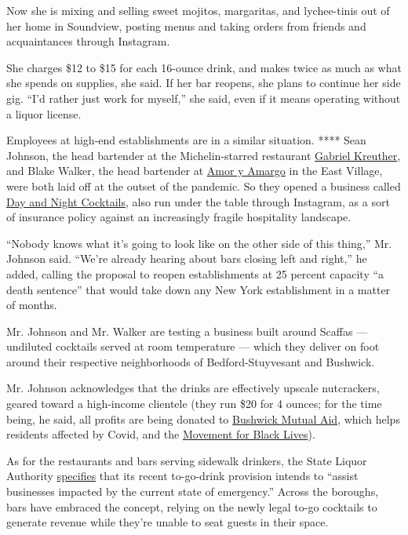 Now she is mixing and selling sweet mojitos, margaritas, and
lychee-tinis out of her home in Soundview, posting menus and taking
orders from friends and acquaintances through Instagram.

She charges \$12 to \$15 for each 16-ounce drink, and makes twice as
much as what she spends on supplies, she said. If her bar reopens, she
plans to continue her side gig. ``I'd rather just work for myself,'' she
said, even if it means operating without a liquor license.

Employees at high-end establishments are in a similar situation. ****
Sean Johnson, the head bartender at the Michelin-starred restaurant
\href{https://www.gknyc.com/}{Gabriel Kreuther}, and Blake Walker, the
head bartender at \href{https://www.amoryamargony.com/}{Amor y Amargo}
in the East Village, were both laid off at the outset of the pandemic.
So they opened a business called
\href{https://www.instagram.com/dayandnightcocktails/}{Day and Night
Cocktails}, also run under the table through Instagram, as a sort of
insurance policy against an increasingly fragile hospitality landscape.

``Nobody knows what it's going to look like on the other side of this
thing,'' Mr. Johnson said. ``We're already hearing about bars closing
left and right,'' he added, calling the proposal to reopen
establishments at 25 percent capacity ``a death sentence'' that would
take down any New York establishment in a matter of months.

Mr. Johnson and Mr. Walker are testing a business built around Scaffas
--- undiluted cocktails served at room temperature --- which they
deliver on foot around their respective neighborhoods of
Bedford-Stuyvesant and Bushwick.

Mr. Johnson acknowledges that the drinks are effectively upscale
nutcrackers, geared toward a high-income clientele (they run \$20 for 4
ounces; for the time being, he said, all profits are being donated to
\href{https://www.facebookcorewwwi.onion/groups/bushwickmutualaid/}{Bushwick
Mutual Aid}, which helps residents affected by Covid, and the
\href{https://m4bl.org/}{Movement for Black Lives}).

As for the restaurants and bars serving sidewalk drinkers, the State
Liquor Authority
\href{https://sla.ny.gov/Restrictions-in-Response-to-COVID-19}{specifies}
that its recent to-go-drink provision intends to ``assist businesses
impacted by the current state of emergency.'' Across the boroughs, bars
have embraced the concept, relying on the newly legal to-go cocktails to
generate revenue while they're unable to seat guests in their space.

